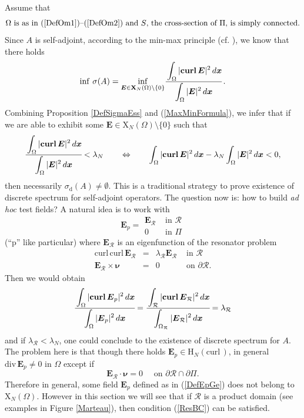 \documentclass[11pt,a4paper]{article}
\newcommand{\dsp}{\displaystyle}
\newcommand{\Om}{\Omega}
\newcommand{\mrm}[1]{\mathrm{#1}}
\newcommand{\bfx}{\boldsymbol{x}}
\newcommand{\bfnu}{\boldsymbol{\nu}}
\newcommand{\mH}{\mrm{H}}
\newcommand{\mX}{\mrm{X}}
\newcommand{\curlvec}{\boldsymbol{\mrm{curl}}\,}
\renewcommand{\div}{\mrm{div}}
\def\E{\boldsymbol{E}}
\begin{document}
Assume that
\begin{equation}\label{HypoOm}
\mbox{$\Om$ is as in (\ref{DefOm1})--(\ref{DefOm2}) and $S$, the cross-section of $\Pi$, is simply connected.} 
\end{equation}
Since $A$ is self-adjoint, according to the min-max principle (cf. \cite[Thm.\,10.2.2]{BiSo87}), we know that there holds
\begin{equation}\label{MaxMinFormula}
\inf\,\sigma(A)=\underset{\E\in\boldsymbol{\mX}_N(\Om)\setminus\{0\}}{\inf}\cfrac{\dsp\int_{\Om}|\curlvec\E|^2\,d\bfx}{\dsp\int_{\Om}|\E|^2\,d\bfx}\,.
\end{equation}
Combining Proposition \ref{DefSigmaEss} and (\ref{MaxMinFormula}), we infer that if we are able to exhibit some $\E\in\boldsymbol{\mX}_N(\Om)\setminus\{0\}$ such that
\begin{equation}\label{RelationsMinMax}
\cfrac{\dsp\int_{\Om}|\curlvec\E|^2\,d\bfx}{\dsp\int_{\Om}|\E|^2\,d\bfx}<\lambda_N\qquad\Leftrightarrow\qquad \dsp\int_{\Om}|\curlvec\E|^2\,d\bfx-\lambda_N\int_{\Om}|\E|^2\,d\bfx<0,
\end{equation}
then necessarily $\sigma_{\mrm{d}}(A)\ne\emptyset$. This is a traditional strategy to prove existence of discrete spectrum for self-adjoint operators. The question now is: how to build \textit{ad hoc} test fields? A natural idea is to work with 
\begin{equation}\label{DefEpGe}
\E_p=\begin{array}{|cl}
\E_\mathcal{R} & \mbox{ in }\mathcal{R}\\
0 & \mbox{ in }\Pi
\end{array}
\end{equation}
(``p'' like particular) where $\E_\mathcal{R}$ is an eigenfunction of the resonator problem
\begin{equation}\label{ResPb}
\begin{array}{|rcll}
\curlvec\curlvec\E_\mathcal{R} &= & \lambda_\mathcal{R}\E_\mathcal{R} & \mbox{ in }\mathcal{R}\\[3pt]
\E_\mathcal{R}\times\bfnu & =&0 &  \mbox{ on }\partial\mathcal{R}.
\end{array}
\end{equation}
Then we would obtain
\[
\cfrac{\dsp\int_{\Om}|\curlvec\E_p|^2\,d\bfx}{\dsp\int_{\Om}|\E_p|^2\,d\bfx}=\cfrac{\dsp\int_{\mathcal{R}}|\curlvec\E_\mathcal{R}|^2\,d\bfx}{\dsp\int_{\Om_\mathcal{R}}|\E_\mathcal{R}|^2\,d\bfx}=\lambda_\mathcal{R}
\]
and if $\lambda_\mathcal{R}<\lambda_N$, one could conclude to the existence of discrete spectrum for $A$. The problem here is that though there holds $\E_p\in\boldsymbol{\mH}_N(\curlvec)$, in general $\div\,\E_p\ne0$ in $\Om$ except if 
\begin{equation}\label{ResBC}
\E_\mathcal{R}\cdot\bfnu=0\quad\mbox{ on }\partial\mathcal{R}\cap\partial\Pi.
\end{equation}
Therefore in general, some field $\E_p$ defined as in (\ref{DefEpGe}) does not belong to $\boldsymbol{\mX}_N(\Om)$. However in this section we will see that if $\mathcal{R}$ is a product domain (see examples in Figure \ref{Marteau}), then condition (\ref{ResBC}) can be satisfied. 
\end{document}
